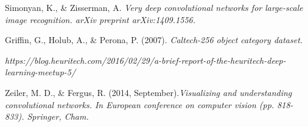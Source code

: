 Simonyan, K., \& Zisserman, A. 
\emph{Very deep convolutional networks for large-scale image recognition. arXiv preprint arXiv:1409.1556.}

 Griffin, G., Holub, A., \& Perona, P. (2007). \emph{Caltech-256 object category dataset.}

 \emph{https://blog.heuritech.com/2016/02/29/a-brief-report-of-the-heuritech-deep-learning-meetup-5/}

 Zeiler, M. D., \& Fergus, R. (2014, September).\emph{Visualizing and understanding convolutional networks. In European conference on computer vision (pp. 818-833). Springer, Cham.}